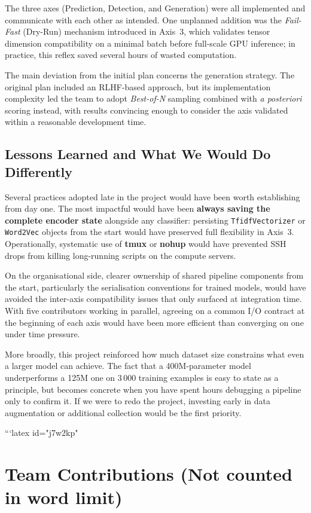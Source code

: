 \documentclass[11pt,a4paper]{article}
\begin{document}
The three axes (Prediction, Detection, and Generation) were all implemented
and communicate with each other as intended. One unplanned addition was the
\textit{Fail-Fast} (Dry-Run) mechanism introduced in Axis~3, which validates
tensor dimension compatibility on a minimal batch before full-scale GPU
inference; in practice, this reflex saved several hours of wasted computation.

The main deviation from the initial plan concerns the generation strategy.
The original plan included an RLHF-based approach, but its implementation
complexity led the team to adopt \textit{Best-of-N} sampling combined with
\textit{a posteriori} scoring instead, with results convincing enough to
consider the axis validated within a reasonable development time.

\subsection{Lessons Learned and What We Would Do Differently}

Several practices adopted late in the project would have been worth
establishing from day one. The most impactful would have been
\textbf{always saving the complete encoder state} alongside any classifier:
persisting \texttt{TfidfVectorizer} or \texttt{Word2Vec} objects from the
start would have preserved full flexibility in Axis~3. Operationally,
systematic use of \textbf{tmux} or \textbf{nohup} would have prevented SSH
drops from killing long-running scripts on the compute servers.

On the organisational side, clearer ownership of shared pipeline components
from the start, particularly the serialisation conventions for trained
models, would have avoided the inter-axis compatibility issues that only
surfaced at integration time. With five contributors working in parallel,
agreeing on a common I/O contract at the beginning of each axis would have
been more efficient than converging on one under time pressure.

More broadly, this project reinforced how much dataset size constrains what
even a larger model can achieve. The fact that a 400M-parameter model
underperforms a 125M one on 3\,000 training examples is easy to state as a
principle, but becomes concrete when you have spent hours debugging a
pipeline only to confirm it. If we were to redo the project, investing early
in data augmentation or additional collection would be the first priority.

```latex id="j7w2kp"
\section{Team Contributions (Not counted in word limit)}
\end{document}
